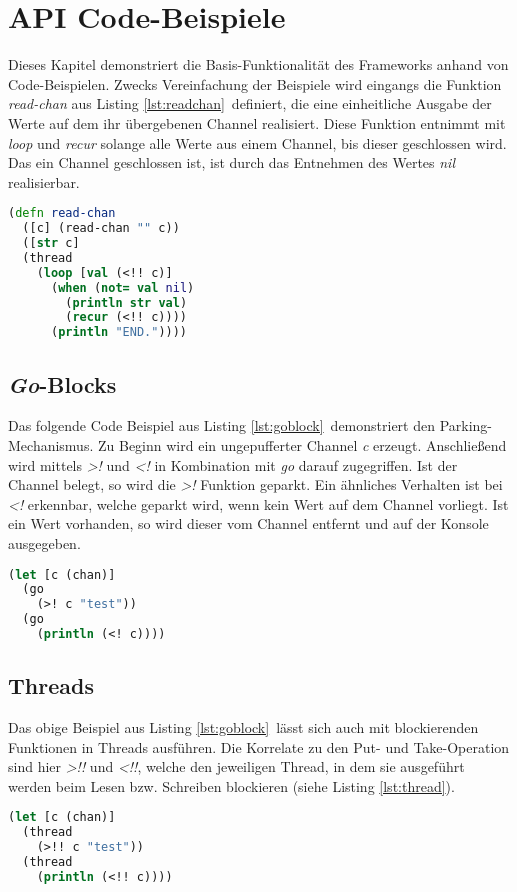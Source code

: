 \section{\acs{API} Code-Beispiele}
Dieses Kapitel demonstriert die Basis-Funktionalität des Frameworks anhand von Code-Beispielen. Zwecks Vereinfachung der Beispiele wird eingangs die Funktion \textit{read-chan} aus Listing \ref{lst:readchan}\  definiert, die eine einheitliche Ausgabe der Werte auf dem ihr übergebenen Channel realisiert. Diese Funktion entnimmt mit \textit{loop} und \textit{recur} solange alle Werte aus einem Channel, bis dieser geschlossen wird. Das ein Channel geschlossen ist, ist durch das Entnehmen des Wertes \textit{nil} realisierbar.
\begin{lstlisting}[language=Clojure,caption=\textit{read-chan} Hilfsfunktion,label=lst:readchan]
(defn read-chan
  ([c] (read-chan "" c))
  ([str c]
  (thread
    (loop [val (<!! c)]
      (when (not= val nil)
        (println str val)
        (recur (<!! c))))
      (println "END."))))
\end{lstlisting}
\subsection{\textit{Go}-Blocks}
Das folgende Code Beispiel aus Listing \ref{lst:goblock}\ demonstriert den Parking-Mechanismus. Zu Beginn wird  ein ungepufferter Channel \textit{c} erzeugt. Anschließend wird mittels \textit{>!} und \textit{<!} in Kombination mit \textit{go} darauf zugegriffen. Ist der Channel belegt, so wird die \textit{>!} Funktion geparkt. Ein ähnliches Verhalten ist bei \textit{<!} erkennbar, welche geparkt wird, wenn kein Wert auf dem Channel vorliegt. Ist ein Wert vorhanden, so wird dieser vom Channel entfernt und auf der Konsole ausgegeben.
\begin{lstlisting}[language=Clojure,caption=\textit{Go}-Blocks,label=lst:goblock]
(let [c (chan)]
  (go
    (>! c "test"))
  (go
    (println (<! c))))
\end{lstlisting}
\subsection{Threads}
Das obige Beispiel aus Listing \ref{lst:goblock}\ lässt sich auch mit blockierenden Funktionen in Threads ausführen. Die Korrelate zu den Put- und Take-Operation sind hier \textit{>!!} und \textit{<!!}, welche den jeweiligen Thread, in dem sie ausgeführt werden beim Lesen bzw. Schreiben blockieren (siehe Listing \ref{lst:thread}).
\begin{lstlisting}[language=Clojure,caption=Thread,label=lst:thread]
(let [c (chan)]
  (thread
    (>!! c "test"))
  (thread
    (println (<!! c))))
\end{lstlisting}
